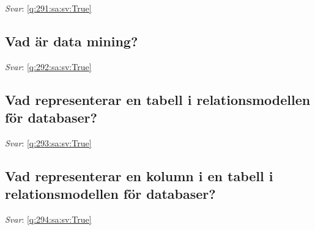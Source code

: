 \documentclass[a4paper,11pt,oneside]{article}
\begin{document}
\begin{sloppypar}
\label{q:291:sa:sv:False}

\vspace{2cm}

\noindent\makebox[\textwidth]{\hrulefill}

\vspace{1cm}

\textit{Svar}: \autoref{q:291:sa:sv:True}



\subsection{Vad \"ar data mining?}

\label{q:292:sa:sv:False}

\vspace{2cm}

\noindent\makebox[\textwidth]{\hrulefill}

\vspace{1cm}

\textit{Svar}: \autoref{q:292:sa:sv:True}



\subsection{Vad representerar en tabell i relationsmodellen f\"or databaser?}

\label{q:293:sa:sv:False}

\vspace{2cm}

\noindent\makebox[\textwidth]{\hrulefill}

\vspace{1cm}

\textit{Svar}: \autoref{q:293:sa:sv:True}



\subsection{Vad representerar en kolumn i en tabell i relationsmodellen f\"or databaser?}

\label{q:294:sa:sv:False}

\vspace{2cm}

\noindent\makebox[\textwidth]{\hrulefill}

\vspace{1cm}

\textit{Svar}: \autoref{q:294:sa:sv:True}




\end{sloppypar}
\end{document}
